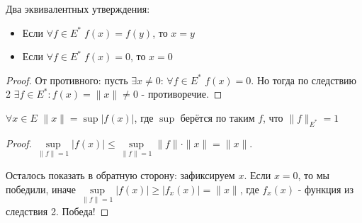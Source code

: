 \begin{corollary} Два эквивалентных утверждения:
\label{hbcorollary3}
\begin{itemize}
    \item Если $\forall f \in E^* \; f(x) = f(y)$, то $x = y$
    \item Если $\forall f \in E^* \; f(x) = 0$, то $x = 0$
\end{itemize}
\end{corollary}
\begin{proof} 
От противного: пусть $\exists x \neq 0$: $\forall f \in E^*$ $f(x) = 0$. Но тогда по следствию 2 $\exists f \in E^*: f(x) = \| x\| \neq 0$ - противоречие.
\end{proof}

\begin{corollary}
\label{hbcorollary4}
$\forall x \in E $ $\|x\| = \sup |f(x)|$, где $\sup$ берётся по таким $f$, что $\| f\| _{E^*} = 1$\end{corollary}
\begin{proof} 
$\sup\limits_{\|f\| = 1} |f(x)| \leqslant \sup\limits_{\|f\| = 1} \|f\| \cdot \|x\| = \|x\|$.

Осталось показать в обратную сторону: зафиксируем $x$. Если $x = 0$, то мы победили, иначе $\sup\limits_{\|f\| = 1} |f(x)| \geqslant |f_x (x) | = \|x\|$, где $f_x(x)$ - функция из следствия 2. Победа!
\end{proof}

